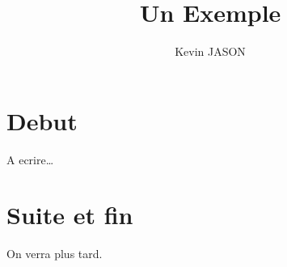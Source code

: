 \documentclass[a4paper,11pt]{article}
\author{K\’evin JASON}
\title{Un Exemple}
\begin{document}
\maketitle
\tableofcontents
\section{D\’ebut}
\‘A \’ecrire\dots
\section{Suite et fin}
On verra plus tard.
\end{document}
